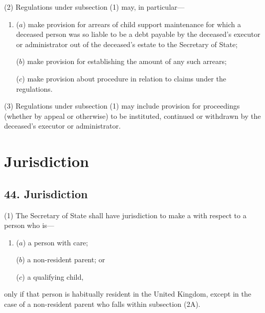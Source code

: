 \documentclass[a4paper]{article}
\begin{document}
(2) Regulations under subsection (1) may, in particular---
\begin{enumerate}\item[]
($a$) make provision for arrears of child support maintenance for which a deceased person was so liable to be a debt payable by the deceased’s executor or administrator out of the deceased’s estate to the Secretary of State;

($b$) make provision for establishing the amount of any such arrears;

($c$) make provision about procedure in relation to claims under the regulations.
\end{enumerate}

(3) Regulations under subsection (1) may include provision for proceedings (whether by appeal or otherwise) to be instituted, continued or withdrawn by the deceased’s executor or administrator.


\section{Jurisdiction}

\subsection{44. Jurisdiction}

(1) The Secretary of State shall have jurisdiction to make a  with respect to a person who is---
\begin{enumerate}\item[]
($a$) a person with care;

($b$) a non-resident parent; or

($c$) a qualifying child,
\end{enumerate}
only if that person is habitually resident in the United Kingdom, except in the case of a non-resident parent who falls within subsection (2A).
\end{document}
